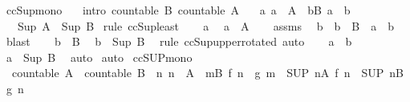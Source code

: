 \begin{isabellebody}
\isanewline
{}\isamarkupfalse%
\ ccSup{\isacharunderscore}mono{\isacharcolon}\isanewline
\ \ \ {\isacharbrackleft}intro{\isacharbrackright}{\isacharcolon}\ {\isachardoublequoteopen}countable\ B{\isachardoublequoteclose}\ {\isachardoublequoteopen}countable\ A{\isachardoublequoteclose}\isanewline
\ \ \ {\isachardoublequoteopen}{\isasymAnd}a{\isachardot}\ a\ {\isasymin}\ A\ {\isasymLongrightarrow}\ {\isasymexists}b{\isasymin}B{\isachardot}\ a\ {\isasymle}\ b{\isachardoublequoteclose}\isanewline
\ \ \ {\isachardoublequoteopen}Sup\ A\ {\isasymle}\ Sup\ B{\isachardoublequoteclose}\isanewline
%
\isadelimproof
%
\endisadelimproof
%
\isatagproof
{}\isamarkupfalse%
\ {\isacharparenleft}rule\ ccSup{\isacharunderscore}least{\isacharparenright}\isanewline
\ \ \isamarkupfalse%
\ a\ \isamarkupfalse%
\ {\isachardoublequoteopen}a\ {\isasymin}\ A{\isachardoublequoteclose}\isanewline
\ \ \isamarkupfalse%
\ assms\ \isamarkupfalse%
\ b\ \ {\isachardoublequoteopen}b\ {\isasymin}\ B{\isachardoublequoteclose}\ \ {\isachardoublequoteopen}a\ {\isasymle}\ b{\isachardoublequoteclose}\ \isamarkupfalse%
\ blast\isanewline
\ \ \isamarkupfalse%
\ {\isacartoucheopen}b\ {\isasymin}\ B{\isacartoucheclose}\ \isamarkupfalse%
\ {\isachardoublequoteopen}b\ {\isasymle}\ Sup\ B{\isachardoublequoteclose}\ \isamarkupfalse%
\ {\isacharparenleft}rule\ ccSup{\isacharunderscore}upper{\isacharbrackleft}rotated{\isacharbrackright}{\isacharparenright}\ auto\isanewline
\ \ \isamarkupfalse%
\ {\isacartoucheopen}a\ {\isasymle}\ b{\isacartoucheclose}\ \isamarkupfalse%
\ {\isachardoublequoteopen}a\ {\isasymle}\ Sup\ B{\isachardoublequoteclose}\ \isamarkupfalse%
\ auto\isanewline
{}\isamarkupfalse%
\ auto%
\endisatagproof
{\isafoldproof}%
%
\isadelimproof
\isanewline
%
\endisadelimproof
\isanewline
{}\isamarkupfalse%
\ ccSUP{\isacharunderscore}mono{\isacharcolon}\isanewline
\ \ {\isachardoublequoteopen}countable\ A\ {\isasymLongrightarrow}\ countable\ B\ {\isasymLongrightarrow}\ {\isacharparenleft}{\isasymAnd}n{\isachardot}\ n\ {\isasymin}\ A\ {\isasymLongrightarrow}\ {\isasymexists}m{\isasymin}B{\isachardot}\ f\ n\ {\isasymle}\ g\ m{\isacharparenright}\ {\isasymLongrightarrow}\ {\isacharparenleft}SUP\ n{\isacharcolon}A{\isachardot}\ f\ n{\isacharparenright}\ {\isasymle}\ {\isacharparenleft}SUP\ n{\isacharcolon}B{\isachardot}\ g\ n{\isacharparenright}{\isachardoublequoteclose}\isanewline

\end{isabellebody}
